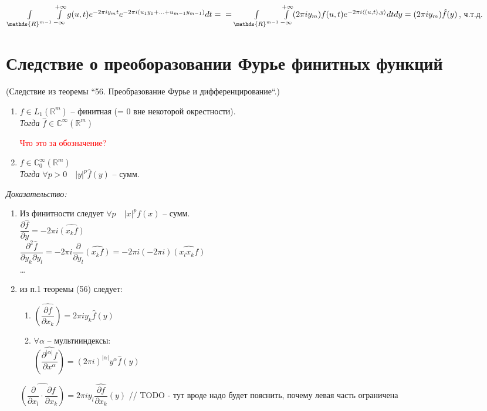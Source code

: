 \documentclass[paper=a4, fontsize=14pt]{report}
\begin{document}
$\int\limits_{\mathds{R}^{m-1}}\int\limits_{-\infty}^{+\infty}g(u, t)e^{-2\pi i y_m t}e^{-2\pi i (u_{1}y_{1}+\ldots+u_{m-1}y_{m-1})}dt =\\
= \int\limits_{\mathds{R}^{m-1}}\int\limits_{-\infty}^{+\infty}(2\pi i y_m)f(u, t)e^{-2\pi i \langle(u, t), y\rangle}dt dy = (2\pi i y_m) \hat{f}(y)$, ч.т.д.

\section{Следствие о преоборазовании Фурье финитных функций}

(Следствие из теоремы ``56. Преобразование Фурье и дифференцирование``.)
\begin{enumerate}
	\item $f \in L_1(\mathbb{R}^m)$ -- финитная (= 0 вне некоторой окрестности).\\
	\emph{Тогда} $\widehat{f} \in \mathbb{C}^{\infty}(\mathbb{R}^m)$
	
	\textcolor{red}{Что это за обозначение?}
	
	\item $f \in \mathbb{C}_0^\infty(\mathbb{R}^m)$\\
	\emph{Тогда} $\forall p > 0 \quad \lvert y \rvert ^ p \widehat{f}(y)$ -- сумм.
\end{enumerate}

\emph{Доказательство:}

\begin{enumerate}
	\item Из финитности следует $\forall p \quad \lvert x \rvert ^ p f(x)$ -- сумм.\\
	$\dfrac{\partial \widehat{f}}{\partial y} = -2\pi i \widehat{(x_k f)}$\\
	$\dfrac{\partial^2 \widehat{f}}{\partial y_k \partial y_l} = -2\pi i \dfrac{\partial}{\partial y_l} \widehat{(x_k f)} = -2\pi i (-2\pi i) \widehat{(x_l x_k f)}$\\ 
	\dots
	\item из п.1 теоремы (56) следует:
	\begin{enumerate}
		\item $\widehat{(\dfrac{\partial f}{\partial x_k})} = 2\pi i y_k \widehat{f}(y)$
		\item $\forall \alpha$ -- мультииндексы:\\
		$\widehat{(\dfrac{\partial^{\lvert\alpha\rvert} f}{\partial x^\alpha})} = (2\pi i)^{\lvert\alpha\rvert} y^\alpha \widehat{f}(y)$
	\end{enumerate}
	
	$\widehat{(\dfrac{\partial}{\partial x_l} \cdot \dfrac{\partial f}{\partial x_k})} = 2\pi i y_l \widehat{\dfrac{\partial f}{\partial x_k}}(y)$ // TODO - тут вроде надо будет пояснить, почему левая часть ограничена
\end{enumerate}
\end{document}
